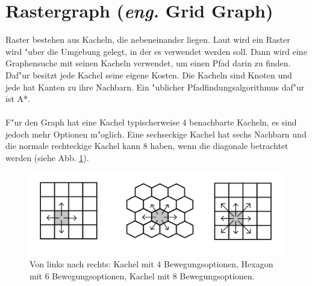 \section{Rastergraph (\textit{eng.} Grid Graph)}
Raster bestehen aus Kacheln, die nebeneinander liegen. Laut \cite{Grid:02} wird ein Raster wird "uber die Umgebung gelegt, in der es verwendet werden soll. Dann wird eine Graphensuche mit seinen Kacheln verwendet, um einen Pfad darin zu finden. Daf"ur besitzt jede Kachel seine eigene Kosten. Die Kacheln sind Knoten und jede hat Kanten zu ihre Nachbarn. Ein "ublicher Pfadfindungsalgorithmus daf"ur ist A*.
\\\\
F"ur den Graph hat eine Kachel typischerweise 4 benachbarte Kacheln, es sind jedoch mehr Optionen m"oglich. Eine sechseckige Kachel hat sechs Nachbarn und die normale rechteckige Kachel kann 8 haben, wenn die diagonale betrachtet werden (siehe Abb. \ref{sec2a}).
\begin{figure} %
	\centering
	\includegraphics[width=\textwidth]{images/Grid_Tiles.png}
	\caption{Von links nach rechts: Kachel mit 4 Bewegungsoptionen, Hexagon mit 6 Bewegungsoptionen, Kachel mit 8 Bewegungsoptionen.}
	\label{sec2a}
\end{figure}


